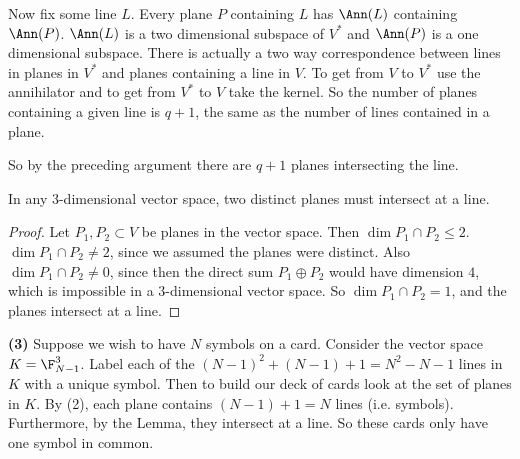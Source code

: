 Now fix some line $L$. Every plane $P$ containing $L$ has $\Ann(L)$ containing $\Ann(P)$. $\Ann(L)$ is a two dimensional subspace of $V^*$ and $\Ann(P)$ is a one dimensional subspace. There is actually a two way correspondence between lines in planes in $V^*$ and planes containing a line in $V$. To get from $V$ to $V^*$ use the annihilator and to get from $V^*$ to $V$ take the kernel. So the number of planes containing a given line is $q+1$, the same as the number of lines contained in a plane. 

So by the preceding argument there are $q+1$ planes intersecting the line.      

\begin{lemma}
  In any $3$-dimensional vector space, two distinct planes must intersect at a line.
\end{lemma}
\begin{proof}
  Let $P_1, P_2\subset V$ be planes in the vector space. Then $\dim P_1\cap P_2 \leq 2$. $\dim P_1\cap P_2\neq 2$, since we assumed the planes were distinct. Also $\dim P_1\cap P_2\neq 0$, since then the direct sum $P_1\oplus P_2$ would have dimension $4$, which is impossible in a $3$-dimensional vector space. So $\dim P_1\cap P_2=1$, and the planes intersect at a line.       
\end{proof}

\textbf{(3)} Suppose we wish to have $N$ symbols on a card. Consider the vector space $K=\F_{N-1}^3$. Label each of the $(N-1)^2+(N-1)+1=N^2-N-1$ lines in $K$ with a unique symbol. Then to build our deck of cards look at the set of planes in $K$. By (2), each plane contains $(N-1)+1=N$ lines (i.e. symbols). Furthermore, by the Lemma, they intersect at a line. So these cards only have one symbol in common.  